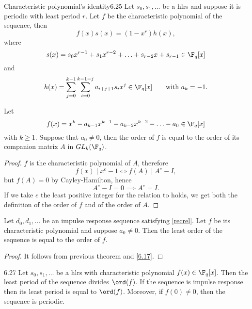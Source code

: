 \begin{teor}{Characteristic polynomial's identity}{6.25}
	Let \(s_0,s_1,\ldots\) be a hlrs and suppose it is periodic with least period \(r\). Let \(f\) be the characteristic polynomial of the sequence, then
	\[
		f(x)s(x) = (1-x^r)h(x),
	\]
	where
	\[
		s(x) = s_0x^{r-1}+s_1x^{r-2}+\ldots+s_{r-2}x+s_{r-1}\in\F_q[x]
	\]
	and
	\[
		h(x) = \sum_{j=0}^{k-1}\sum_{i=0}^{k-1-j}a_{i+j+1}s_i x^j \in \F_q[x] \qquad\text{with }a_k=-1.
	\]
\end{teor}
%
%
\begin{lem}
	Let
	\[
		f(x) = x^k-a_{k-1}x^{k-1}-a_{k-2}x^{k-2}-\ldots-a_0 \in\F_q[x]
	\]
	with \(k\ge 1\). Suppose that \(a_0 \neq 0\), then the order of \(f\) is equal to the order of its companion matrix \(A\) in \(GL_k(\F_q)\).
\end{lem}

\begin{proof}
	\(f\) is the characteristic polynomial of \(A\), therefore
	\[
		f(x) \mid x^e-1 \iff f(A) \mid A^e-I,
	\]
	but \(f(A)=0\) by Cayley-Hamilton, hence
	\[
		A^e-I = 0 \implies A^e = I.
	\]
	If we take \(e\) the least positive integer for the relation to holds, we get both the definition of the order of \(f\) and of the order of \(A\).
\end{proof}

\begin{cor}
	Let \(d_0,d_1,\ldots\) be an impulse response sequence satisfying \eqref{recrel}. Let \(f\) be its characteristic polynomial and suppose \(a_0\neq 0\). Then the least order of the sequence is equal to the order of \(f\).
\end{cor}

\begin{proof}
	It follows from previous theorem and \autoref{6.17}.
\end{proof}

\begin{teor}{}{6.27}
	Let \(s_0,s_1,\ldots\) be a hlrs with characteristic polynomial \(f(x)\in\F_q[x]\). Then the least period of the sequence divides \(\ord(f)\). If the sequence is impulse response then its least period is equal to \(\ord(f)\). Moreover, if \(f(0)\neq0\), then the sequence is periodic.
\end{teor}


